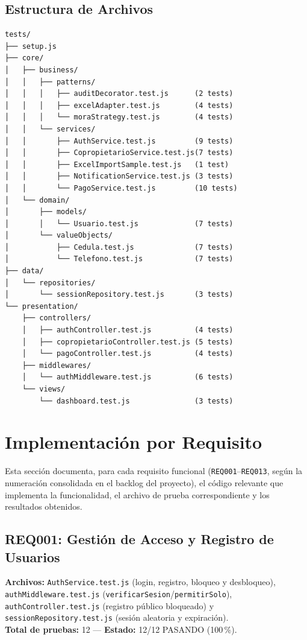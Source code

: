 \documentclass[12pt,a4paper]{article}
\begin{document}
\subsection{Estructura de Archivos}

\begin{lstlisting}[language={},caption={Estructura del directorio \texttt{tests/}}]
tests/
├── setup.js
├── core/
│   ├── business/
│   │   ├── patterns/
│   │   │   ├── auditDecorator.test.js      (2 tests)
│   │   │   ├── excelAdapter.test.js        (4 tests)
│   │   │   └── moraStrategy.test.js        (4 tests)
│   │   └── services/
│   │       ├── AuthService.test.js         (9 tests)
│   │       ├── CopropietarioService.test.js(7 tests)
│   │       ├── ExcelImportSample.test.js   (1 test)
│   │       ├── NotificationService.test.js (3 tests)
│   │       └── PagoService.test.js         (10 tests)
│   └── domain/
│       ├── models/
│       │   └── Usuario.test.js             (7 tests)
│       └── valueObjects/
│           ├── Cedula.test.js              (7 tests)
│           └── Telefono.test.js            (7 tests)
├── data/
│   └── repositories/
│       └── sessionRepository.test.js       (3 tests)
└── presentation/
    ├── controllers/
    │   ├── authController.test.js          (4 tests)
    │   ├── copropietarioController.test.js (5 tests)
    │   └── pagoController.test.js          (4 tests)
    ├── middlewares/
    │   └── authMiddleware.test.js          (6 tests)
    └── views/
        └── dashboard.test.js               (3 tests)
\end{lstlisting}

\clearpage

\section{Implementación por Requisito}

Esta sección documenta, para cada requisito funcional (\texttt{REQ001}–\texttt{REQ013},
según la numeración consolidada en el backlog del proyecto), el código relevante que
implementa la funcionalidad, el archivo de prueba correspondiente y los resultados
obtenidos.

\subsection{REQ001: Gestión de Acceso y Registro de Usuarios}
\textbf{Archivos:} \texttt{AuthService.test.js} (login, registro, bloqueo y desbloqueo),
\texttt{authMiddleware.test.js} (\texttt{verificarSesion}/\texttt{permitirSolo}),
\texttt{authController.test.js} (registro público bloqueado) y
\texttt{sessionRepository.test.js} (sesión aleatoria y expiración).\\
\textbf{Total de pruebas:} 12 — \textbf{Estado:} 12/12 PASANDO (100\,\%).
\end{document}
